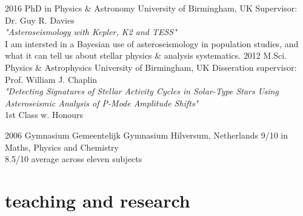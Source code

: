 \documentclass[]{k-cv} %
\begin{document}
\begin{entrylist}
\entry
{2016 }
{PhD {\normalfont in Physics \& Astronomy}}
{University of Birmingham, UK}
{Supervisor: Dr. Guy R. Davies\\
\emph{"Asteroseismology with \textit{Kepler}, K2 and TESS"} \vspace{0.2cm}\\
I am intersted in a Bayesian use of asteroseismology in population studies, and what it can tell us about stellar physics \& analysis systematics.\vspace{0.2cm}}
\entry
{2012 }
{M.Sci. {\normalfont Physics \& Astrophysics}}
{University of Birmingham, UK}
{Disseration supervisor: Prof. William J. Chaplin\\
\emph{"Detecting Signatures of Stellar Activity Cycles in Solar-Type Stars Using Asteroseismic Analysis of P-Mode Amplitude Shifts"} \\ 
1st Class w. Honours\vspace{0.2cm}}


\entry
{2006 }
{Gymnasium}
{Gemeentelijk Gymnasium Hilversum, Netherlands}
{9/10 in Maths, Physics and Chemistry\\
8.5/10 average across eleven subjects}
\end{entrylist}


\section{teaching and research}
\end{document}
